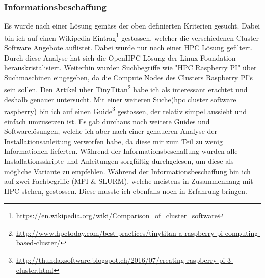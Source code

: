 \subsubsection{Informationsbeschaffung}
Es wurde nach einer Lösung gemäss der oben definierten Kriterien gesucht. Dabei bin ich auf einen Wikipedia Eintrag\footnote{\url{https://en.wikipedia.org/wiki/Comparison\_of\_cluster\_software}} gestossen, welcher die verschiedenen Cluster Software Angebote auflistet. Dabei wurde nur nach einer HPC Lösung gefiltert. Durch diese Analyse hat sich die OpenHPC Lösung der Linux Foundation herauskristalisiert. Weiterhin wurden Suchbegriffe wie "HPC Raspberry PI" über Suchmaschinen eingegeben, da die Compute Nodes des Clusters Raspberry PI's sein sollen. Den Artikel über TinyTitan\footnote{\url{http://www.hpctoday.com/best-practices/tinytitan-a-raspberry-pi-computing-based-cluster/}} habe ich als interessant erachtet und deshalb genauer untersucht.
Mit einer weiteren Suche(hpc cluster software raspberry) bin ich auf einen Guide\footnote{\url{http://thundaxsoftware.blogspot.ch/2016/07/creating-raspberry-pi-3-cluster.html}} gestossen, der relativ simpel aussieht und einfach umzusetzen ist. Es gab durchaus noch weitere Guides und Softwarelösungen, welche ich aber nach einer genaueren Analyse der Installationsanleitung verworfen habe, da diese mir zum Teil zu wenig Informationen lieferten. Während der Informationsbeschaffung wurden alle Installationsskripte und Anleitungen sorgfältig durchgelesen, um diese als mögliche Variante zu empfehlen. Während der Informationsbeschaffung bin ich auf zwei Fachbegriffe (MPI \& SLURM), welche meistens in Zusammenhang mit HPC stehen, gestossen. Diese musste ich ebenfalls noch in Erfahrung bringen.





